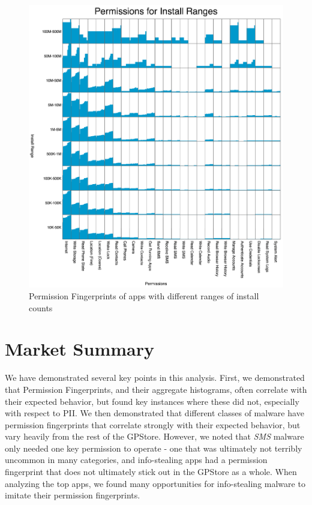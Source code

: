 \begin{figure}[h]
\begin{center}
\includegraphics[width=1.0\columnwidth]{figs/PermissionsforInstallRanges}
\caption{Permission Fingerprints of apps with different ranges of install counts}
\label{fig:topappsfingerprint}
\end{center}
\end{figure}



\section{Market Summary}
We have demonstrated several key points in this analysis. First, we demonstrated that Permission Fingerprints, and their aggregate histograms, often correlate with their expected behavior, but found key instances where these did not, especially with respect to PII. We then demonstrated that different classes of malware have permission fingerprints that correlate strongly with their expected behavior, but vary heavily from the rest of the GPStore. However, we noted that \textit{SMS} malware only needed one key permission to operate - one that was ultimately not terribly uncommon in many categories, and info-stealing apps had a permission fingerprint that does not ultimately stick out in the GPStore as a whole. When analyzing the top apps, we found many opportunities for info-stealing malware to imitate their permission fingerprints.

